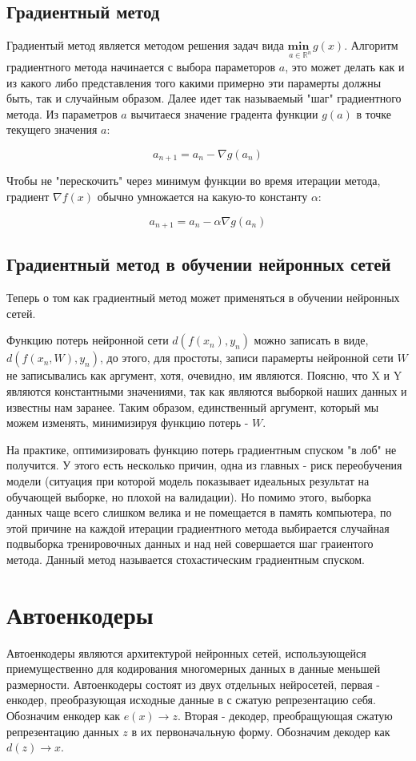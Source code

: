 \documentclass{article}
\begin{document}
\subsection{Градиентный метод}
Градиентый метод является методом решения задач вида $\underset{a \in \mathds{R}^n}{\textbf{min }} g(x)$. Алгоритм градиентного метода начинается с выбора
параметоров $a$, это может делать как и из какого либо представления того какими примерно эти парамерты должны быть, так и случайным образом. Далее
идет так называемый "шаг" градиентного метода. Из параметров $a$ вычитаеся значение градента функции $g(a)$ в точке текущего значения $a$:

$$ a_{n + 1} = a_n - \nabla g(a_n)$$

Чтобы не "перескочить" через минимум функции во время итерации метода, градиент $\nabla f(x)$ обычно умножается на какую-то константу $\alpha$:

$$ a_{n + 1} = a_n - \alpha \nabla g(a_n)$$

\subsection{Градиентный метод в обучении нейронных сетей}
Теперь о том как градиентный метод может применяться в обучении нейронных сетей.

Функцию потерь нейронной сети $d(f(x_n), y_n)$ можно записать в виде, $d(f(x_n, W), y_n)$, до этого, для простоты, записи парамерты нейронной сети $W$ не записывались
как аргумент, хотя, очевидно, им являются. Поясню, что X и Y являются константными значениями, так как являются выборкой наших
данных и известны нам заранее. Таким образом, единственный аргумент, который мы можем изменять, минимизируя функцию потерь - $W$.

На практике, оптимизировать функцию потерь градиентным спуском "в лоб" не получится. У этого есть несколько причин, одна из главных - риск переобучения
модели (ситуация при которой модель показывает идеальных результат на обучающей выборке, но плохой на валидации). Но помимо этого, выборка данных
чаще всего слишком велика и не помещается в память компьютера, по этой причине на каждой итерации градиентного метода выбирается случайная подвыборка
тренировочных данных и над ней совершается шаг граиентого метода. Данный метод называется стохастическим градиентным спуском.

\section{Автоенкодеры}
Автоенкодеры являются архитектурой нейронных сетей, использующейся приемущественно для кодирования многомерных данных в данные меньшей
размерности. Автоенкодеры состоят из двух отдельных нейросетей, первая - енкодер, преобразующая исходные данные в с сжатую репрезентацию себя. 
Обозначим енкодер как $e(x) \rightarrow z$. Вторая - декодер, преобращующая сжатую репрезентацию данных $z$ в их первоначальную форму. Обозначим декодер
как $d(z) \rightarrow \widehat{x}$. 
\end{document}
